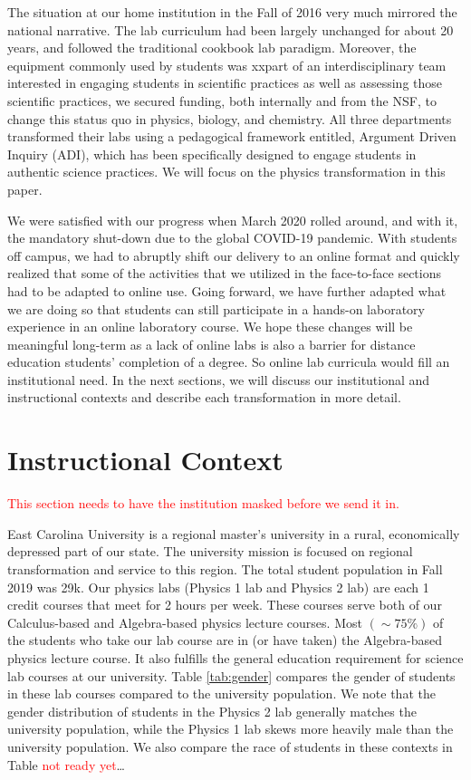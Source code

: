 \documentclass[aip, numerical, preprint]{revtex4-2}
\begin{document}
The situation at our home institution in the Fall of 2016 very much mirrored the national
narrative.  The lab curriculum had been largely unchanged for about 20 years, and followed the
traditional cookbook lab paradigm.  Moreover, the equipment commonly used by students was
xxpart of an interdisciplinary team interested in engaging students in scientific practices as
well as assessing those scientific practices, we secured funding, both internally and from the
NSF, to change this status quo in physics, biology, and chemistry.  All three departments
transformed their labs using a pedagogical framework entitled, Argument Driven Inquiry
(ADI),\cite{Sampson2011,Walker2011,Walker2016} which has been specifically designed to engage
students in authentic science practices. We will focus on the physics transformation in this
paper.

We were satisfied with our progress when March 2020 rolled around, and with it, the mandatory
shut-down due to the global COVID-19 pandemic.  With students off campus, we had to abruptly shift our
delivery to an online format and quickly realized that some of the activities that we utilized
in the face-to-face sections had to be adapted to online use.  Going forward, we have further
adapted what we are doing so that students can still participate in a hands-on laboratory
experience in an online laboratory course.  We hope these changes will be meaningful long-term as a lack of online labs is
also a barrier for distance education students' completion of a degree.  So online lab curricula would fill an
institutional need.  In the next sections, we will discuss our institutional and instructional
contexts and describe each transformation in more detail.

\section{Instructional Context}
\textcolor{red}{This section needs to have the institution masked before we send it in.}

East Carolina University is a regional master's university in a rural, economically depressed
part of our state.  The university mission is focused on regional transformation and service to
this region.  The total student population in Fall 2019 was 29k.  Our physics labs (Physics 1
lab and Physics 2 lab) are each 1 credit courses that meet for 2 hours per week. These courses
serve both of our Calculus-based and Algebra-based physics lecture courses.  Most $(\sim 75\%)$
of the students who take our lab course are in (or have taken) the Algebra-based physics
lecture course. It also fulfills the general education requirement for science lab courses at
our university.  Table \ref{tab:gender} compares the gender of students in these lab courses
compared to the university population.  We note that the gender distribution of students in the
Physics 2 lab generally matches the university population, while the Physics 1 lab skews more
heavily male than the university population.  We also compare the race of students in these
contexts in Table \textcolor{red}{not ready yet}\ldots
\end{document}
